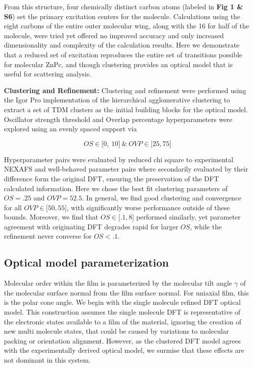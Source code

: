 From this structure, four chemically distinct carbon atoms (labeled in \textbf{Fig 1 \& S6}) set the primary excitation centers for the molecule. Calculations using the eight carbons of the entire outer molecular wing, along with the 16 for half of the molecule, were tried yet offered no improved accuracy and only increased dimensionality and complexity of the calculation results. Here we demonstrate that a reduced set of excitation reproduces the entire set of transitions possible for molecular ZnPc, and though clustering provides an optical model that is useful for scattering analysis.

\textbf{Clustering and Refinement:} Clustering and refinement were performed using the Igor Pro implementation of the hierarchical agglomerative clustering to extract a set of TDM clusters as the initial building blocks for the optical model. Oscillator strength threshold and Overlap percentage hyperparameters were explored using an evenly spaced support via

\[OS \in \lbrack 0,\ 10\rbrack\ \&\ OVP \in \lbrack 25,75\rbrack\]

Hyperparameter pairs were evaluated by reduced chi square to experimental NEXAFS and well-behaved parameter pairs where secondarily evaluated by their difference form the original DFT, ensuring the preservation of the DFT calculated information. Here we chose the best fit clustering parameters of \(OS = .25\) and \(OVP = 52.5\). In general, we find good clustering and convergence for all \(OVP \in \lbrack 50,55\rbrack\), with significantly worse performance outside of these bounds. Moreover, we find that \(OS \in \lbrack.1,8\rbrack\) performed similarly, yet parameter agreement with originating DFT degrades rapid for larger \(OS\), while the refinement never converse for \(OS < .1\).

\subsection{Optical model parameterization}\label{optical-model-parameterization}

Molecular order within the film is parameterized by the molecular tilt angle \(\gamma\) of the molecular surface normal from the film surface normal. For uniaxial film, this is the polar cone angle. We begin with the single molecule refined DFT optical model. This construction assumes the single molecule DFT is representative of the electronic states available to a film of the material, ignoring the creation of new multi molecule states, that could be caused by variations to molecular packing or orientation alignment. However, as the clustered DFT model agrees with the experimentally derived optical model, we surmise that these effects are not dominant in this system.

